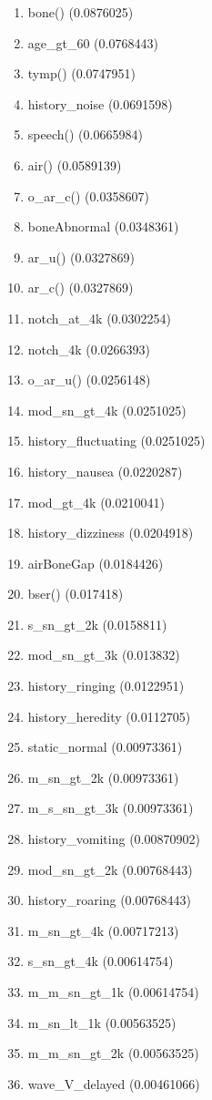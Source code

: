 \begin{enumerate}
\item bone() (0.0876025)
\item age\_gt\_60 (0.0768443)
\item tymp() (0.0747951)
\item history\_noise (0.0691598)
\item speech() (0.0665984)
\item air() (0.0589139)
\item o\_ar\_c() (0.0358607)
\item boneAbnormal (0.0348361)
\item ar\_u() (0.0327869)
\item ar\_c() (0.0327869)
\item notch\_at\_4k (0.0302254)
\item notch\_4k (0.0266393)
\item o\_ar\_u() (0.0256148)
\item mod\_sn\_gt\_4k (0.0251025)
\item history\_fluctuating (0.0251025)
\item history\_nausea (0.0220287)
\item mod\_gt\_4k (0.0210041)
\item history\_dizziness (0.0204918)
\item airBoneGap (0.0184426)
\item bser() (0.017418)
\item s\_sn\_gt\_2k (0.0158811)
\item mod\_sn\_gt\_3k (0.013832)
\item history\_ringing (0.0122951)
\item history\_heredity (0.0112705)
\item static\_normal (0.00973361)
\item m\_sn\_gt\_2k (0.00973361)
\item m\_s\_sn\_gt\_3k (0.00973361)
\item history\_vomiting (0.00870902)
\item mod\_sn\_gt\_2k (0.00768443)
\item history\_roaring (0.00768443)
\item m\_sn\_gt\_4k (0.00717213)
\item s\_sn\_gt\_4k (0.00614754)
\item m\_m\_sn\_gt\_1k (0.00614754)
\item m\_sn\_lt\_1k (0.00563525)
\item m\_m\_sn\_gt\_2k (0.00563525)
\item wave\_V\_delayed (0.00461066)

\end{enumerate}
